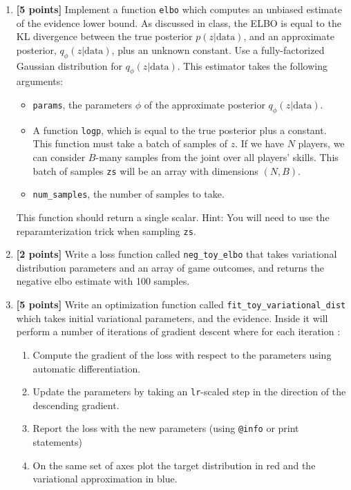 \documentclass{article}
\begin{document}
\begin{enumerate}[label=(\alph*)]
  \item {\bf [5 points]} Implement a function \texttt{elbo} which computes an unbiased estimate of 
    the evidence lower bound.
    As discussed in class, the ELBO is equal to the KL divergence between the true posterior $p(z|\text{data})$, and an approximate posterior, $q_\phi(z|\text{data})$, plus an unknown constant.
    Use a fully-factorized Gaussian distribution for $q_\phi(z|\text{data})$.
    This estimator takes the following arguments:
    \begin{itemize}
    	\item \texttt{params}, the parameters $\phi$ of the approximate posterior $q_\phi(z|\text{data})$.
    	\item A function \texttt{logp}, which is equal to the true posterior plus a constant.  This function must take a batch of samples of $z$.  If we have $N$ players, we can consider $B$-many samples from the joint over all players' skills.
    	This batch of samples \texttt{zs} will be an array with dimensions $(N,B)$.
    	\item \texttt{num\_samples}, the number of samples to take.
    \end{itemize}
    This function should return a single scalar.
    Hint: You will need to use the reparamterization trick when sampling \texttt{zs}.
  \item {\bf [2 points]} Write a loss function called \texttt{neg\_toy\_elbo}
    that takes variational distribution parameters and an array of game outcomes, and returns the negative
    elbo estimate with 100 samples.
  \item {\bf [5 points]} Write an optimization function called \texttt{fit\_toy\_variational\_dist}
    which takes initial variational parameters, and the evidence.
    Inside it will perform a number of iterations of gradient descent where for each iteration :
    \begin{enumerate}
      \item Compute the gradient of the loss with respect to the parameters using automatic differentiation.
      \item Update the parameters by taking an \texttt{lr}-scaled step in the direction of the descending gradient.
      \item Report the loss with the new parameters (using \texttt{@info} or print statements)
      \item On the same set of axes plot the target distribution in red and the variational approximation in blue.

\end{enumerate}
\end{enumerate}
\end{document}
